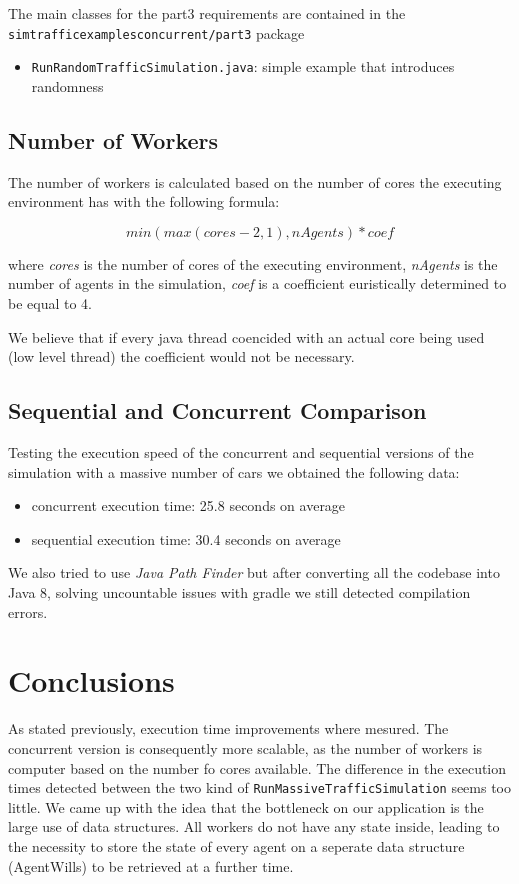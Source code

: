 \documentclass[12pt, a4paper]{report}
\begin{document}
The main classes for the part3 requirements are contained in the\\ \texttt{simtrafficexamplesconcurrent/part3} package
\begin{itemize}
    \item \texttt{RunRandomTrafficSimulation.java}: simple example that introduces randomness
\end{itemize}

\section{Number of Workers}
The number of workers  is calculated based on the number of cores the executing environment has with the following
 formula:

\[min(max(cores - 2, 1), nAgents) * coef\]

where \emph{cores} is the number of cores of the executing environment, \emph{nAgents} is the number of agents in the simulation,
 \emph{coef} is a coefficient euristically determined to be equal to 4.

We believe that if every java thread coencided with an actual core being used (low level thread) the coefficient
 would not be necessary. 

\section{Sequential and Concurrent Comparison}
Testing the execution speed of the concurrent and sequential versions of the simulation with a massive number of cars
 we obtained the following data:
\begin{itemize}
    \item concurrent execution time: 25.8 seconds on average
    \item sequential execution time: 30.4 seconds on average
\end{itemize}
We also tried to use \emph{Java Path Finder} but after converting all the codebase into Java 8, solving uncountable issues with gradle we still detected compilation errors.

\chapter{Conclusions}
As stated previously, execution time improvements where mesured. The concurrent version is consequently more scalable, as the number of workers is computer based on the number fo cores available. The difference in the execution times detected between the two kind of \texttt{RunMassiveTrafficSimulation} seems too little. We came up with the idea that the bottleneck on our application is the large use of data structures. All workers do not have any state inside, leading to the necessity to store the state of every agent on a seperate data structure (AgentWills) to be retrieved at a further time.



\end{document}
